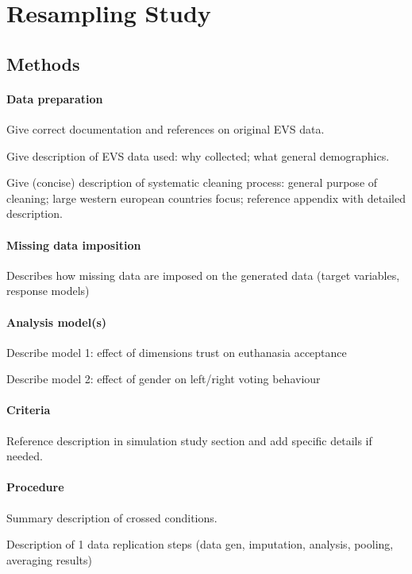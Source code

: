 \maketitle
\section{Resampling Study}

\subsection{Methods}

\paragraph{Data preparation}
	Give correct documentation and references on original EVS data.

	Give description of EVS data used: why collected; what general demographics.

	Give (concise) description of systematic cleaning process: general purpose of cleaning; 
	large western european countries focus; reference appendix with detailed description.

\paragraph{Missing data imposition}
	Describes how missing data are imposed on the generated data (target variables, response models)

\paragraph{Analysis model(s)}
	Describe model 1: effect of dimensions trust on euthanasia acceptance

	Describe model 2: effect of gender on left/right voting behaviour

\paragraph{Criteria}
	Reference description in simulation study section and add specific details if needed.

\paragraph{Procedure}
	Summary description of crossed conditions.

	Description of 1 data replication steps (data gen, imputation, analysis, pooling, averaging results)

